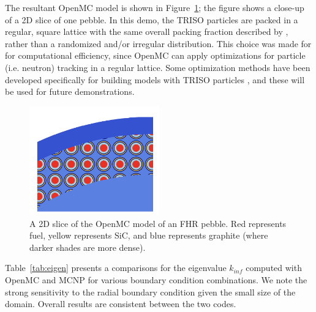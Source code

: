 The resultant OpenMC model is shown in Figure~\ref{f:openmc_pebble}; the figure shows a close-up of a 2D slice of one pebble.  In this demo, the TRISO particles are packed in a regular, square lattice with the same overall packing fraction described by \cite{phillips2010}, rather than a randomized and/or irregular distribution.  This choice was made for for computational efficiency, since OpenMC can apply optimizations for particle (i.e. neutron) tracking in a regular lattice.  Some optimization methods have been developed specifically for building models with TRISO particles \cite{openmcdocs_triso}, and these will be used for future demonstrations.

\begin{figure}[!h]
\centering
\includegraphics[clip=true,width=0.5\textwidth]{Figures/pebble_yz_cropped.png}
\caption{A 2D slice of the OpenMC model of an FHR pebble.  Red represents fuel, yellow represents
SiC, and blue represents graphite (where darker shades are more dense).}
\label{f:openmc_pebble}
\end{figure}

Table~\ref{tab:eigen} presents a comparisons for the eigenvalue {$k_{inf}$} computed with OpenMC and MCNP for various boundary condition combinations. We note the strong sensitivity to the radial boundary condition given the small size of the domain. Overall results are consistent between the two codes.

